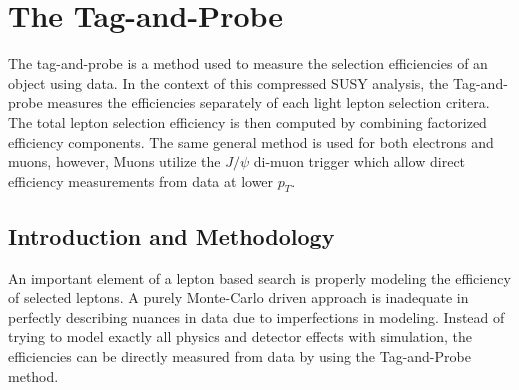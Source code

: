 \newcommand{\ID}{\text{ID}}
\newcommand{\Prompt}{\text{Prompt}}
\newcommand{\Isolated}{\text{Isolated}}
\newcommand{\Gold}{\text{Gold}}
\newcommand{\Silver}{\text{Silver}}
\newcommand{\Bronze}{\text{Bronze}}



\newcommand\FigureFour[6]{%
\begin{figure}[!htbp]%
\centering
\texttt{[image: fig/Lep\_Obj\_plots/\#1]}\hfill
\texttt{[image: fig/Lep\_Obj\_plots/\#2]}\hfill
\texttt{[image: fig/Lep\_Obj\_plots/\#3]}\hfill
\texttt{[image: fig/Lep\_Obj\_plots/\#4]}\hfill
\caption{#6}
\label{#5}
\end{figure}}

\setcounter{secnumdepth}{3}
\setcounter{tocdepth}{3}
\setlength{\parskip}{\smallskipamount}
\setlength{\parindent}{0pt}


\makeatletter


\providecommand{\tabularnewline}{\\}


\makeatother

%

\chapter{The Tag-and-Probe}

\begin{chapterabstract}
The tag-and-probe is a method used to measure the selection efficiencies of an object using data. In the context of this compressed SUSY analysis, the Tag-and-probe measures the efficiencies separately of each light lepton selection critera. The total lepton selection efficiency is then computed by combining factorized efficiency components. The same general method is used for both electrons and muons, however, Muons utilize  the $J/\psi$ di-muon trigger which allow direct efficiency measurements from data at lower $p_T$.
\end{chapterabstract}

\section{Introduction and Methodology}
An important element of a lepton based search is properly modeling the efficiency of selected leptons. A purely Monte-Carlo driven approach is inadequate in perfectly describing nuances in data due to imperfections in modeling. Instead of trying to model exactly all physics and detector effects with simulation, the efficiencies can be directly measured from data by using the Tag-and-Probe method. 

